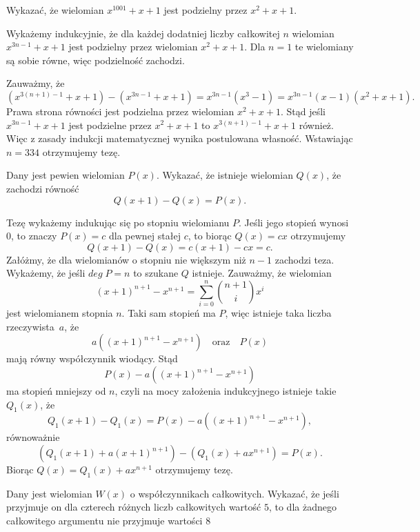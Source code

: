 \begin{problem}{3}
    Wykazać, że wielomian $x^{1001} + x + 1$ jest podzielny przez $x^2 + x + 1$.
\end{problem}

\noindent
Wykażemy indukcyjnie, że dla każdej dodatniej liczby całkowitej $n$ wielomian $x^{3n - 1} + x + 1$ jest podzielny przez wielomian $x^2 + x + 1$. Dla $n = 1$ te wielomiany są sobie równe, więc podzielność zachodzi.
 
\vspace{10 px}
\noindent
Zauważmy, że
\[
    (x^{3(n + 1) - 1} + x + 1) - (x^{3n - 1} + x + 1) = x^{3n - 1}(x^3 - 1) =   x^{3n - 1}(x - 1)(x^2 + x + 1).
\]
Prawa strona równości jest podzielna przez wielomian $x^2 + x + 1$. Stąd jeśli $x^{3n - 1} + x + 1$ jest podzielne przez $x^2 + x + 1$ to $x^{3(n + 1) - 1} + x + 1$ również. Więc z zasady indukcji matematycznej wynika postulowana własność. Wstawiając $n = 334$ otrzymujemy tezę.


\begin{problem}{4}
    Dany jest pewien wielomian $P(x)$. Wykazać, że istnieje wielomian $Q(x)$, że zachodzi równość
    \[
        Q(x + 1) - Q(x) = P(x).
    \]
\end{problem}

\noindent
Tezę wykażemy indukując się po stopniu wielomianu $P$. Jeśli jego stopień wynosi $0$, to znaczy $P(x) = c$ dla pewnej stałej $c$, to biorąc $Q(x) = cx$ otrzymujemy
\[
    Q(x + 1) - Q(x) = c(x + 1) - cx = c.
\]
Załóżmy, że dla wielomianów o stopniu nie większym niż $n - 1$ zachodzi teza. Wykażemy, że jeśli ${deg\; P = n}$ to szukane $Q$ istnieje.
Zauważmy, że wielomian 
\[
    (x + 1)^{n + 1} - x^{n + 1} = \sum^{n}_{i = 0} {{n + 1}\choose{i}}x^i
\]
jest wielomianem stopnia $n$. Taki sam stopień ma $P$, więc istnieje taka liczba rzeczywista~$a$, że
\[
    a\left((x + 1)^{n + 1} - x^{n + 1} \right) \quad \text{oraz} \quad P(x)
\]
mają równy współczynnik wiodący. Stąd
\[
    P(x) - a\left((x + 1)^{n + 1} - x^{n + 1} \right)
\]
ma stopień mniejszy od $n$, czyli na mocy założenia indukcyjnego istnieje takie $Q_1(x)$, że
\[
    Q_1(x + 1) - Q_1(x) = P(x) - a\left((x + 1)^{n + 1} - x^{n + 1} \right),
\]
równoważnie
\[
    (Q_1(x + 1) + a(x + 1)^{n + 1}) - (Q_1(x) + ax^{n + 1}) = P(x).
\]
Biorąc $Q(x) = Q_1(x) + ax^{n + 1}$ otrzymujemy tezę.

\begin{problem}{5}
    Dany jest wielomian $W(x)$ o współczynnikach całkowitych. Wykazać, że jeśli przyjmuje on dla czterech różnych liczb całkowitych wartość $5$, to dla żadnego całkowitego argumentu nie przyjmuje wartości $8$
\end{problem}

